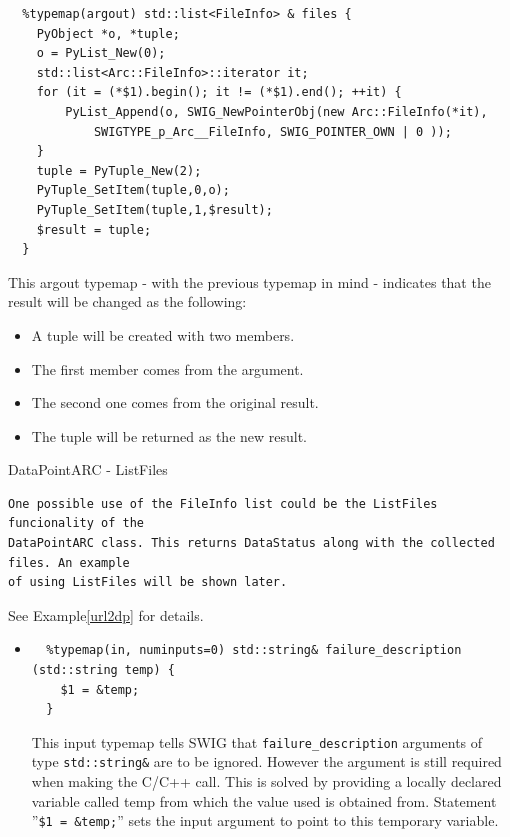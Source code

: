 \documentclass{article}
\begin{document}
\begin{flushleft}
\begin{itemize}
{  \begin{verbatim}
  %typemap(argout) std::list<FileInfo> & files {
    PyObject *o, *tuple;
    o = PyList_New(0);
    std::list<Arc::FileInfo>::iterator it;
    for (it = (*$1).begin(); it != (*$1).end(); ++it) {
        PyList_Append(o, SWIG_NewPointerObj(new Arc::FileInfo(*it), 
            SWIGTYPE_p_Arc__FileInfo, SWIG_POINTER_OWN | 0 ));
    }
    tuple = PyTuple_New(2);
    PyTuple_SetItem(tuple,0,o);
    PyTuple_SetItem(tuple,1,$result);
    $result = tuple;
  }
  \end{verbatim}
  This argout typemap - with the previous typemap in mind - indicates that the result will be changed as the following:
    \begin{itemize}
    \item{
      A tuple will be created with two members.
    }
    \item{
      The first member comes from the argument.
    }
    \item{
      The second one comes from the original result.
    }
    \item{
      The tuple will be returned as the new result.
    }
    \end{itemize}
    \begin{example}
      \caption{DataPointARC - ListFiles}\label{lfex}
\begin{verbatim}
One possible use of the FileInfo list could be the ListFiles funcionality of the 
DataPointARC class. This returns DataStatus along with the collected files. An example 
of using ListFiles will be shown later.
\end{verbatim} See Example\ref{url2dp} for details.
    \end{example}
  }
\end{itemize}
\begin{itemize}
  \item{ \begin{verbatim}
  %typemap(in, numinputs=0) std::string& failure_description (std::string temp) {
    $1 = &temp;
  }
  \end{verbatim}
  This input typemap tells SWIG that \verb$failure_description$ arguments of type \verb$std::string&$
  are to be ignored. However the argument is still required when making the C/C++ call. 
  This is solved by providing a locally declared variable called temp from which the value 
  used is obtained from. Statement ''\verb#$1 = &temp;#'' sets the input argument to point to this temporary variable.
  }
\end{itemize}

\end{flushleft}
\end{document}

